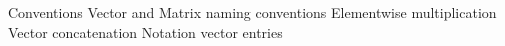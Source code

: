 Conventions
Vector and Matrix naming conventions
Elementwise multiplication
Vector concatenation
Notation vector entries
